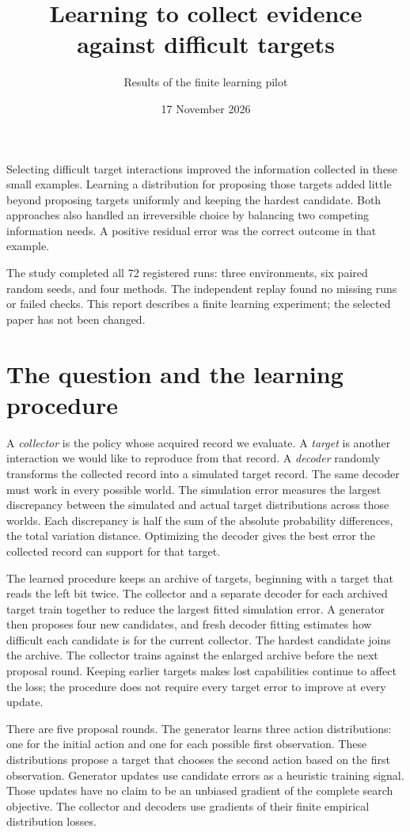 \documentclass[11pt]{article}
\title{Learning to collect evidence against difficult targets}
\author{Results of the finite learning pilot}
\date{17 November 2026}
\begin{document}
\maketitle

Selecting difficult target interactions improved the information collected in
these small examples. Learning a distribution for proposing those targets added
little beyond proposing targets uniformly and keeping the hardest candidate.
Both approaches also handled an irreversible choice by balancing two competing
information needs. A positive residual error was the correct outcome in that
example.

The study completed all 72 registered runs: three environments, six paired
random seeds, and four methods. The independent replay found no missing runs or
failed checks. This report describes a finite learning experiment; the selected
paper has not been changed.

\section{The question and the learning procedure}

A \emph{collector} is the policy whose acquired record we evaluate. A
\emph{target} is another interaction we would like to reproduce from that
record. A \emph{decoder} randomly transforms the collected record into a
simulated target record. The same decoder must work in every possible world.
The simulation error measures the largest discrepancy between the simulated
and actual target distributions across those worlds. Each discrepancy is half
the sum of the absolute probability differences, the total variation distance.
Optimizing the decoder gives the best error the collected record can support
for that target.

The learned procedure keeps an archive of targets, beginning with a target that
reads the left bit twice. The collector and a separate decoder for each archived
target train together to reduce the largest fitted simulation error. A
generator then proposes four new candidates, and fresh decoder fitting estimates
how difficult each candidate is for the current collector. The hardest candidate
joins the archive. The collector trains against the enlarged archive before the
next proposal round. Keeping earlier targets makes lost capabilities continue
to affect the loss; the procedure does not require every target error to improve
at every update.

There are five proposal rounds. The generator learns three action distributions:
one for the initial action and one for each possible first observation.
These distributions propose a target that chooses the second action based on
the first observation. Generator updates use candidate errors as a heuristic
training signal. Those updates have no claim to
be an unbiased gradient of the complete search objective. The collector and
decoders use gradients of their finite empirical distribution losses.
\end{document}

